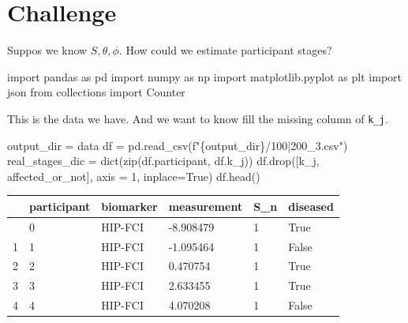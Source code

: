 \documentclass[
  letterpaper,
  DIV=11,
  numbers=noendperiod]{scrreprt}
\newenvironment{Shaded}{\begin{snugshade}}{\end{snugshade}}
\newcommand{\BuiltInTok}[1]{\textcolor[rgb]{0.00,0.23,0.31}{#1}}
\newcommand{\DecValTok}[1]{\textcolor[rgb]{0.68,0.00,0.00}{#1}}
\newcommand{\ImportTok}[1]{\textcolor[rgb]{0.00,0.46,0.62}{#1}}
\newcommand{\NormalTok}[1]{\textcolor[rgb]{0.00,0.23,0.31}{#1}}
\newcommand{\OperatorTok}[1]{\textcolor[rgb]{0.37,0.37,0.37}{#1}}
\newcommand{\SpecialCharTok}[1]{\textcolor[rgb]{0.37,0.37,0.37}{#1}}
\newcommand{\SpecialStringTok}[1]{\textcolor[rgb]{0.13,0.47,0.30}{#1}}
\newcommand{\StringTok}[1]{\textcolor[rgb]{0.13,0.47,0.30}{#1}}
\newcommand{\VariableTok}[1]{\textcolor[rgb]{0.07,0.07,0.07}{#1}}
\begin{document}
\section{Challenge}\label{challenge}

Suppos we know \(S, \theta, \phi\). How could we estimate participant
stages?

\begin{Shaded}
\begin{Highlighting}[]
\ImportTok{import}\NormalTok{ pandas }\ImportTok{as}\NormalTok{ pd }
\ImportTok{import}\NormalTok{ numpy }\ImportTok{as}\NormalTok{ np }
\ImportTok{import}\NormalTok{ matplotlib.pyplot }\ImportTok{as}\NormalTok{ plt }
\ImportTok{import}\NormalTok{ json }
\ImportTok{from}\NormalTok{ collections }\ImportTok{import}\NormalTok{ Counter}
\end{Highlighting}
\end{Shaded}

This is the data we have. And we want to know fill the missing column of
\texttt{k\_j}.

\begin{Shaded}
\begin{Highlighting}[]
\NormalTok{output\_dir }\OperatorTok{=} \StringTok{\textquotesingle{}data\textquotesingle{}}
\NormalTok{df }\OperatorTok{=}\NormalTok{ pd.read\_csv(}\SpecialStringTok{f"}\SpecialCharTok{\{}\NormalTok{output\_dir}\SpecialCharTok{\}}\SpecialStringTok{/100|200\_3.csv"}\NormalTok{)}
\NormalTok{real\_stages\_dic }\OperatorTok{=} \BuiltInTok{dict}\NormalTok{(}\BuiltInTok{zip}\NormalTok{(df.participant, df.k\_j))}
\NormalTok{df.drop([}\StringTok{\textquotesingle{}k\_j\textquotesingle{}}\NormalTok{, }\StringTok{\textquotesingle{}affected\_or\_not\textquotesingle{}}\NormalTok{], axis }\OperatorTok{=} \DecValTok{1}\NormalTok{, inplace}\OperatorTok{=}\VariableTok{True}\NormalTok{)}
\NormalTok{df.head()}
\end{Highlighting}
\end{Shaded}

\begin{longtable}[]{@{}llllll@{}}
\toprule\noalign{}
& participant & biomarker & measurement & S\_n & diseased \\
\midrule\noalign{}
\endhead
\bottomrule\noalign{}
\endlastfoot
0 & 0 & HIP-FCI & -8.908479 & 1 & True \\
1 & 1 & HIP-FCI & -1.095464 & 1 & False \\
2 & 2 & HIP-FCI & 0.470754 & 1 & True \\
3 & 3 & HIP-FCI & 2.633455 & 1 & True \\
4 & 4 & HIP-FCI & 4.070208 & 1 & False \\
\end{longtable}
\end{document}
